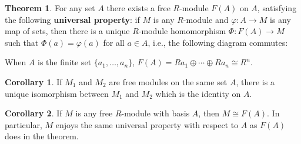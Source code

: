 \documentclass[12pt]{article}
\newcommand{\keyword}[1]{\textbf{#1}}
\theoremstyle{definition}
\newtheorem{theorem}{Theorem}
\newtheorem{corollary}{Corollary}
\renewcommand{\phi}{\varphi}
\newcommand{\<}{\left\langle}
\renewcommand{\>}{\right\rangle}
\newcommand{\isom}{\cong}
\newcommand{\dsum}{\oplus}
\begin{document}
\newpage
\begin{theorem}
    For any set $A$ there exists a free $R$-module $F(A)$ on $A$, satisfying the following \keyword{universal property}: if $M$ is any $R$-module and $\phi : A \to M$ is any map of sets, then there is a unique $R$-module homomorphism $\Phi : F(A) \to M$ such that $\Phi(a) = \phi(a)$ for all $a \in A$, i.e., the following diagram commutes:
    \begin{center}
    \end{center}
    \begin{center}
    \end{center}
    \begin{center}
    \end{center}
    When $A$ is the finite set $\{a_1, \dots, a_n\}$, $F(A) = Ra_1 \dsum \cdots \dsum Ra_n \isom R^n$.
\end{theorem}

\begin{corollary}
    If $M_1$ and $M_2$ are free modules on the same set $A$, there is a unique isomorphism between $M_1$ and $M_2$ which is the identity on $A$.
\end{corollary}

\begin{corollary}
    If $M$ is any free $R$-module with basis $A$, then $M \isom F(A)$. In particular, $M$ enjoys the same universal property with respect to $A$ as $F(A)$ does in the theorem.
\end{corollary}
\end{document}

